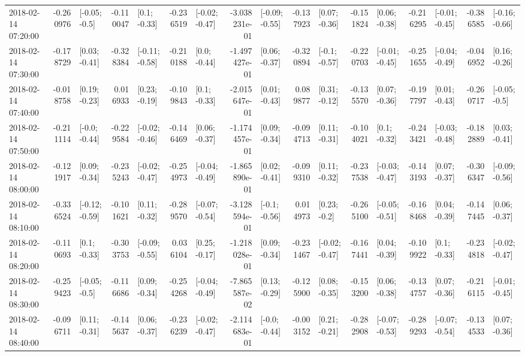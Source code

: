 \begin{tabular}{lrlrlrlrlrlrlrlrl}
2018-02-14 07:20:00 & -0.260976 &   [-0.05; -0.5] & -0.110047 &    [0.1; -0.33] & -0.236519 &  [-0.02; -0.47] & -3.038231e-01 &  [-0.09; -0.55] & -0.137923 &   [0.07; -0.36] & -0.151824 &   [0.06; -0.38] & -0.216295 &  [-0.01; -0.45] & -0.386585 &  [-0.16; -0.66] \\
2018-02-14 07:30:00 & -0.178729 &   [0.03; -0.41] & -0.328384 &  [-0.11; -0.58] & -0.210188 &    [0.0; -0.44] & -1.497427e-01 &   [0.06; -0.37] & -0.320894 &   [-0.1; -0.57] & -0.220703 &  [-0.01; -0.45] & -0.251655 &  [-0.04; -0.49] & -0.046952 &   [0.16; -0.26] \\
2018-02-14 07:40:00 & -0.018758 &   [0.19; -0.23] &  0.016933 &   [0.23; -0.19] & -0.109843 &    [0.1; -0.33] & -2.015647e-01 &   [0.01; -0.43] &  0.089877 &   [0.31; -0.12] & -0.135570 &   [0.07; -0.36] & -0.197797 &   [0.01; -0.43] & -0.260717 &   [-0.05; -0.5] \\
2018-02-14 07:50:00 & -0.211114 &   [-0.0; -0.44] & -0.229584 &  [-0.02; -0.46] & -0.146469 &   [0.06; -0.37] & -1.174457e-01 &   [0.09; -0.34] & -0.094713 &   [0.11; -0.31] & -0.104021 &    [0.1; -0.32] & -0.243421 &  [-0.03; -0.48] & -0.182889 &   [0.03; -0.41] \\
2018-02-14 08:00:00 & -0.121917 &   [0.09; -0.34] & -0.235243 &  [-0.02; -0.47] & -0.254973 &  [-0.04; -0.49] & -1.865890e-01 &   [0.02; -0.41] & -0.099310 &   [0.11; -0.32] & -0.237538 &  [-0.03; -0.47] & -0.143193 &   [0.07; -0.37] & -0.306347 &  [-0.09; -0.56] \\
2018-02-14 08:10:00 & -0.336524 &  [-0.12; -0.59] & -0.101621 &   [0.11; -0.32] & -0.289570 &  [-0.07; -0.54] & -3.128594e-01 &   [-0.1; -0.56] &  0.014973 &    [0.23; -0.2] & -0.265100 &  [-0.05; -0.51] & -0.168468 &   [0.04; -0.39] & -0.147445 &   [0.06; -0.37] \\
2018-02-14 08:20:00 & -0.110693 &    [0.1; -0.33] & -0.303753 &  [-0.09; -0.55] &  0.036104 &   [0.25; -0.17] & -1.218028e-01 &   [0.09; -0.34] & -0.231467 &  [-0.02; -0.47] & -0.167441 &   [0.04; -0.39] & -0.109922 &    [0.1; -0.33] & -0.234818 &  [-0.02; -0.47] \\
2018-02-14 08:30:00 & -0.259423 &   [-0.05; -0.5] & -0.116686 &   [0.09; -0.34] & -0.254268 &  [-0.04; -0.49] & -7.865587e-02 &   [0.13; -0.29] & -0.125900 &   [0.08; -0.35] & -0.153200 &   [0.06; -0.38] & -0.134757 &   [0.07; -0.36] & -0.216115 &  [-0.01; -0.45] \\
2018-02-14 08:40:00 & -0.096711 &   [0.11; -0.31] & -0.145637 &   [0.06; -0.37] & -0.236239 &  [-0.02; -0.47] & -2.114683e-01 &   [-0.0; -0.44] & -0.003152 &   [0.21; -0.21] & -0.282908 &  [-0.07; -0.53] & -0.289293 &  [-0.07; -0.54] & -0.134533 &   [0.07; -0.36] \\

\end{tabular}
